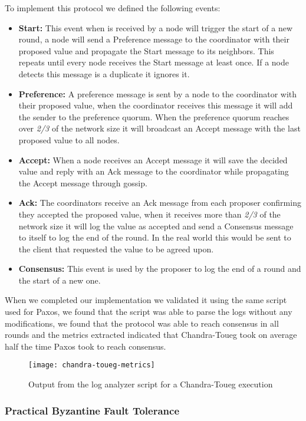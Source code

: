 To implement this protocol we defined the following events:
\begin{itemize}
	\item \textbf{Start: } This event when is received by a node will trigger the start of a new round,
a node will send a Preference message to the coordinator with their proposed value and propagate the Start message
to its neighbors. This repeats until every node receives the Start message at least once. If a node detects
this message is a duplicate it ignores it.
	\item \textbf{Preference: } A preference message is sent by a node to the coordinator with their proposed value,
	when the coordinator receives this message it will add the sender to the preference quorum. When the preference quorum
	reaches over \textit{2/3} of the network size it will broadcast an Accept message with the last proposed value to all nodes.
	\item \textbf{Accept: } When a node receives an Accept message it will save the decided value and reply
	with an Ack message to the coordinator while propagating the Accept message through gossip.
	\item \textbf{Ack: } The coordinators receive an Ack message from each proposer confirming they accepted the proposed value,
	when it receives more than \textit{2/3} of the network size it will log the value as accepted and send a Consensus message
	to itself to log the end of the round. In the real world this would be sent to the client that requested the value to be agreed upon.
	\item \textbf{Consensus: }	This event is used by the proposer to log the end of a round and the start of a new one.
\end{itemize}

When we completed our implementation we validated it using the same script used for Paxos,
we found that the script was able to parse the logs without any modifications, we found that
the protocol was able to reach consensus in all rounds and the metrics extracted indicated that
Chandra-Toueg took on average half the time Paxos took to reach consensus.

\begin{figure}[h]
	\centering
	\texttt{[image: chandra-toueg-metrics]}
	\caption{Output from the log analyzer script for a Chandra-Toueg execution}
	\label{fig:chandra-toueg-metrics}
\end{figure}

\subsubsection{Practical Byzantine Fault Tolerance}\label{sub:practical_byzantine_fault_tolerance}

